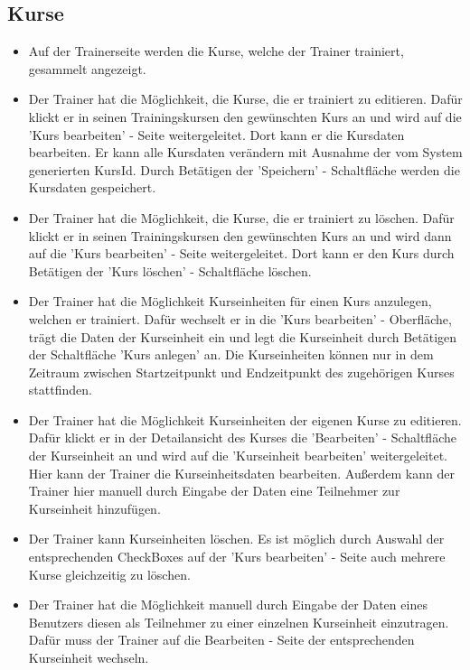 \documentclass[a4paper]{scrreprt}
\begin{document}
\subsection{Kurse}
\begin{itemize}
	\item {}
	Auf der Trainerseite werden die Kurse, welche der Trainer trainiert, gesammelt angezeigt.
	\item {}
	Der Trainer hat die Möglichkeit, die Kurse, die er  trainiert zu editieren. Dafür klickt er in seinen Trainingskursen den gewünschten Kurs an und wird auf die 'Kurs bearbeiten' - Seite weitergeleitet. 
	Dort kann er die Kursdaten bearbeiten. Er kann alle Kursdaten verändern mit Ausnahme der vom System generierten KursId. Durch Betätigen der 'Speichern' - Schaltfläche werden die Kursdaten gespeichert.
	\item {}
	Der Trainer hat die Möglichkeit, die Kurse, die er  trainiert zu löschen. Dafür klickt er in seinen Trainingskursen den gewünschten Kurs an und wird dann auf die 'Kurs bearbeiten' - Seite weitergeleitet. 
	Dort kann er den Kurs durch Betätigen der 'Kurs löschen' - Schaltfläche löschen.
	\item {}
	Der Trainer hat die Möglichkeit Kurseinheiten für einen Kurs anzulegen, welchen er trainiert. Dafür wechselt er in die 'Kurs bearbeiten' - Oberfläche, trägt die Daten der Kurseinheit ein und legt die Kurseinheit durch Betätigen der Schaltfläche 'Kurs anlegen' an. Die Kurseinheiten können nur in dem Zeitraum zwischen Startzeitpunkt und Endzeitpunkt des zugehörigen Kurses stattfinden.
	\item {}
	Der Trainer hat die Möglichkeit Kurseinheiten der eigenen Kurse zu editieren. Dafür klickt er in der Detailansicht des Kurses die 'Bearbeiten' - Schaltfläche der Kurseinheit an und wird auf die 'Kurseinheit bearbeiten' weitergeleitet. Hier kann der Trainer die Kurseinheitsdaten bearbeiten. Außerdem kann der Trainer hier manuell durch Eingabe der Daten eine Teilnehmer zur Kurseinheit hinzufügen.
	\item {}
	Der Trainer kann Kurseinheiten löschen. Es ist möglich durch Auswahl der entsprechenden CheckBoxes auf der 'Kurs bearbeiten' - Seite auch mehrere Kurse gleichzeitig zu löschen.
	\item {}
	Der Trainer hat die Möglichkeit manuell durch Eingabe der Daten eines Benutzers diesen als Teilnehmer zu einer einzelnen Kurseinheit einzutragen. Dafür muss der Trainer auf die Bearbeiten - Seite der entsprechenden Kurseinheit wechseln.

\end{itemize}
\end{document}

